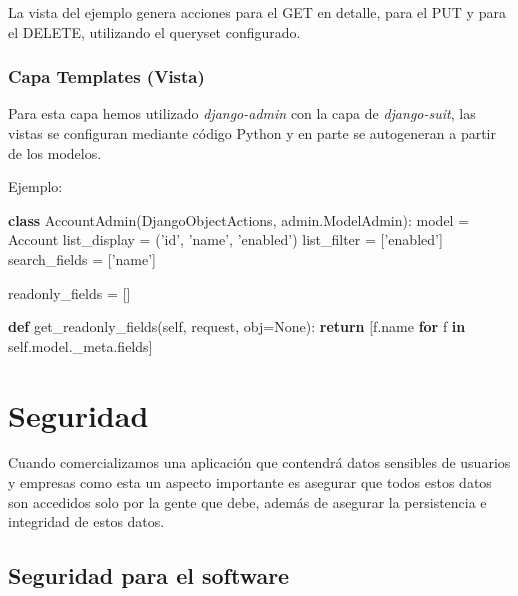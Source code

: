 \documentclass[12pt,a4paperpaper,]{report}
\newenvironment{Shaded}{}{}
\newcommand{\KeywordTok}[1]{\textcolor[rgb]{0.00,0.44,0.13}{\textbf{#1}}}
\newcommand{\StringTok}[1]{\textcolor[rgb]{0.25,0.44,0.63}{#1}}
\newcommand{\VariableTok}[1]{\textcolor[rgb]{0.10,0.09,0.49}{#1}}
\newcommand{\ControlFlowTok}[1]{\textcolor[rgb]{0.00,0.44,0.13}{\textbf{#1}}}
\newcommand{\OperatorTok}[1]{\textcolor[rgb]{0.40,0.40,0.40}{#1}}
\newcommand{\NormalTok}[1]{#1}
\begin{document}
La vista del ejemplo genera acciones para el GET en detalle, para el PUT
y para el DELETE, utilizando el queryset configurado.

\subsection{Capa Templates (Vista)}\label{capa-templates-vista}

Para esta capa hemos utilizado \emph{django-admin} con la capa de
\emph{django-suit}, las vistas se configuran mediante código Python y en
parte se autogeneran a partir de los modelos.

Ejemplo:

\begin{Shaded}
\begin{Highlighting}[]
\KeywordTok{class}\NormalTok{ AccountAdmin(DjangoObjectActions, admin.ModelAdmin):}
\NormalTok{    model }\OperatorTok{=}\NormalTok{ Account}
\NormalTok{    list_display }\OperatorTok{=}\NormalTok{ (}\StringTok{'id'}\NormalTok{, }\StringTok{'name'}\NormalTok{, }\StringTok{'enabled'}\NormalTok{)}
\NormalTok{    list_filter }\OperatorTok{=}\NormalTok{ [}\StringTok{'enabled'}\NormalTok{]}
\NormalTok{    search_fields }\OperatorTok{=}\NormalTok{ [}\StringTok{'name'}\NormalTok{]}

\NormalTok{    readonly_fields }\OperatorTok{=}\NormalTok{ []}

    \KeywordTok{def}\NormalTok{ get_readonly_fields(}\VariableTok{self}\NormalTok{, request, obj}\OperatorTok{=}\VariableTok{None}\NormalTok{):}
        \ControlFlowTok{return}\NormalTok{ [f.name }\ControlFlowTok{for}\NormalTok{ f }\KeywordTok{in} \VariableTok{self}\NormalTok{.model._meta.fields]}
\end{Highlighting}
\end{Shaded}

\chapter{Seguridad}\label{seguridad}

Cuando comercializamos una aplicación que contendrá datos sensibles de
usuarios y empresas como esta un aspecto importante es asegurar que
todos estos datos son accedidos solo por la gente que debe, además de
asegurar la persistencia e integridad de estos datos.

\section{Seguridad para el software}\label{seguridad-para-el-software}
\end{document}
